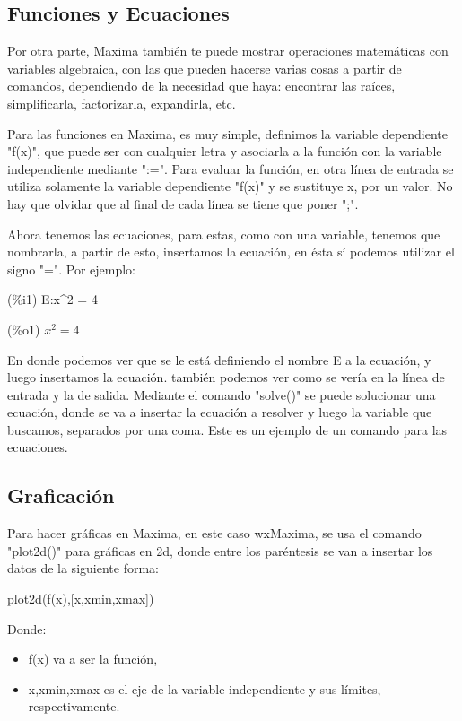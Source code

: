 \documentclass[a4paper]{article}
\begin{document}
\subsection{Funciones y Ecuaciones}

Por otra parte, Maxima también te puede mostrar operaciones matemáticas con variables algebraica, con las que pueden hacerse varias cosas a partir de comandos, dependiendo de la necesidad que haya: encontrar las raíces, simplificarla, factorizarla, expandirla, etc.

\bigskip

Para las funciones en Maxima, es muy simple, definimos la variable dependiente "f(x)", que puede ser con cualquier letra y asociarla a la función con la variable independiente mediante ":=". Para evaluar la función, en otra línea de entrada se utiliza solamente la variable dependiente "f(x)" y se sustituye x, por un valor. No hay que olvidar que al final de cada línea se tiene que poner ";".

Ahora tenemos las ecuaciones, para estas, como con una variable, tenemos que nombrarla, a partir de esto, insertamos la ecuación, en ésta sí podemos utilizar el signo "=". Por ejemplo:
\begin{center}
(\%i1) E:x\textasciicircum 2 = 4

(\%o1) $x^2 = 4$
\end{center}
En donde podemos ver que se le está definiendo el nombre E a la ecuación, y luego insertamos la ecuación. también podemos ver como se vería en la línea de entrada y la de salida. Mediante el comando "solve()" se puede solucionar una ecuación, donde se va a insertar la ecuación a resolver y luego la variable que buscamos, separados por una coma. Este es un ejemplo de un comando para las ecuaciones.

\subsection{Graficación}
Para hacer gráficas en Maxima, en este caso wxMaxima, se usa el comando "plot2d()" para gráficas en 2d, donde entre los paréntesis se van a insertar los datos de la siguiente forma:

\begin{center}
plot2d(f(x),[x,xmin,xmax])
\end{center}
Donde:
\begin{itemize}
\item f(x) va a ser la función,
\item x,xmin,xmax es el eje de la variable independiente y sus límites, respectivamente.
\end{itemize}
\end{document}
